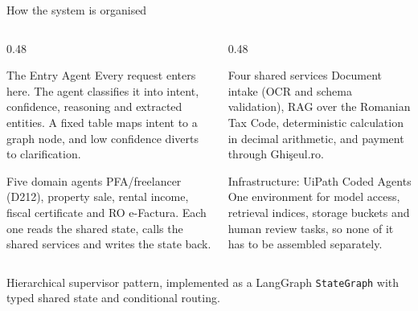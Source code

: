 \documentclass[aspectratio=169,10pt]{beamer}
\newcommand{\cmt}[1]{{\color{stone}\small #1}}          %
\begin{document}
\begin{frame}{How the system is organised}
  \begin{columns}[T]
    \begin{column}{0.48\textwidth}
      \begin{block}{The Entry Agent}
        \small Every request enters here. The agent classifies it into intent, confidence,
        reasoning and extracted entities. A fixed table maps intent to a graph node, and low
        confidence diverts to clarification.
      \end{block}
      \begin{block}{Five domain agents}
        \small PFA/freelancer (D212), property sale, rental income, fiscal certificate and
        RO e-Factura. Each one reads the shared state, calls the shared services and writes
        the state back.
      \end{block}
    \end{column}
    \begin{column}{0.48\textwidth}
      \begin{block}{Four shared services}
        \small Document intake (OCR and schema validation), RAG over the Romanian Tax Code,
        deterministic calculation in decimal arithmetic, and payment through Ghi\c{s}eul.ro.
      \end{block}
      \begin{block}{Infrastructure: UiPath Coded Agents}
        \small One environment for model access, retrieval indices, storage buckets and human
        review tasks, so none of it has to be assembled separately.
      \end{block}
    \end{column}
  \end{columns}
  \vfill
  \cmt{Hierarchical supervisor pattern, implemented as a LangGraph \texttt{StateGraph} with
  typed shared state and conditional routing.}
\end{frame}
\end{document}
